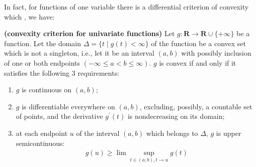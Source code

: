 \documentclass{article}
\newcommand{\bfs}[1]{\textbf{({#1}) }}
\begin{document}
In fact, for functions of one variable there is a differential criterion of convexity which , we have:
\begin{thma}{\bfs{convexity criterion for univariate functions}}\label{thm:ccuf}
Let $g: \mathbf{R} \rightarrow \mathbf{R} \cup\{+\infty\}$ be a function. Let the domain $\Delta=\{t \mid g(t)<\infty\}$ of the function be a convex set which is not a singleton, i.e., let it be an interval $(a, b)$ with possibly inclusion of one or both endpoints $(-\infty \leq a<b \leq \infty) $. $g$ is convex if and only if it satisfies the following 3 requirements:
\begin{enumerate}
    \item $g$ is continuous on $(a, b)$;
    \item $g$ is differentiable everywhere on $(a, b)$, excluding, possibly, a countable set of points, and the derivative $g^{\prime}(t)$ is nondecreasing on its domain;
    \item at each endpoint $u$ of the interval $(a, b)$ which belongs to $\Delta$, $g$ is upper semicontinuous:
\begin{align*}
g(u) \geq \lim \sup _{t \in(a, b), t \rightarrow u} g(t)
\end{align*}
\end{enumerate}
\end{thma}
\end{document}
